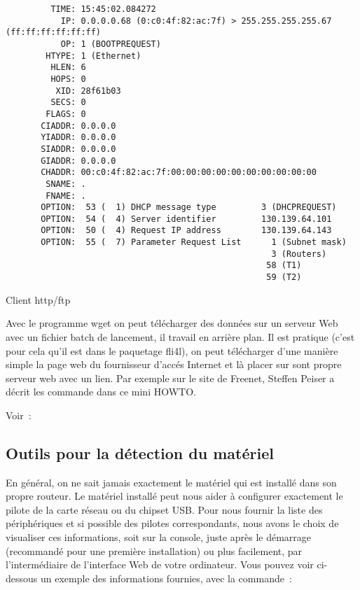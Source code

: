 \begin{description}
\begin{example}
\begin{verbatim}
         TIME: 15:45:02.084272
           IP: 0.0.0.0.68 (0:c0:4f:82:ac:7f) > 255.255.255.255.67 (ff:ff:ff:ff:ff:ff)
           OP: 1 (BOOTPREQUEST)
        HTYPE: 1 (Ethernet)
         HLEN: 6
         HOPS: 0
          XID: 28f61b03
         SECS: 0
        FLAGS: 0
       CIADDR: 0.0.0.0
       YIADDR: 0.0.0.0
       SIADDR: 0.0.0.0
       GIADDR: 0.0.0.0
       CHADDR: 00:c0:4f:82:ac:7f:00:00:00:00:00:00:00:00:00:00
        SNAME: .
        FNAME: .
       OPTION:  53 (  1) DHCP message type         3 (DHCPREQUEST)
       OPTION:  54 (  4) Server identifier         130.139.64.101
       OPTION:  50 (  4) Request IP address        130.139.64.143
       OPTION:  55 (  7) Parameter Request List      1 (Subnet mask)
                                                     3 (Routers)
                                                    58 (T1)
                                                    59 (T2)
\end{verbatim}
\end{example}

 Client http/ftp

    Avec le programme wget on peut télécharger des données sur un serveur Web
    avec un fichier batch de lancement, il travail en arrière plan. Il est pratique
    (c'est pour cela qu'il est dans le paquetage fli4l), on peut télécharger
    d'une manière simple la page web du fournisseur d'accés Internet et là placer
    sur sont propre serveur web avec un lien. Par exemple sur le site de Freenet,
    Steffen Peiser a décrit les commande dans ce mini HOWTO.

    Voir~: 


\end{description}

\subsection{Outils pour la détection du matériel}

En général, on ne sait jamais exactement le matériel qui est installé dans son
propre routeur. Le matériel installé peut nous aider à configurer exactement
le pilote de la carte réseau ou du chipset USB. Pour nous fournir la liste
des périphériques et si possible des pilotes correspondants, nous avons le
choix de visualiser ces informations, soit sur la console, juste après le
démarrage (recommandé pour une première installation) ou plus facilement,
par l'intermédiaire de l'interface Web de votre ordinateur. Vous pouvez
voir ci-dessous un exemple des informations fournies, avec la commande~:

